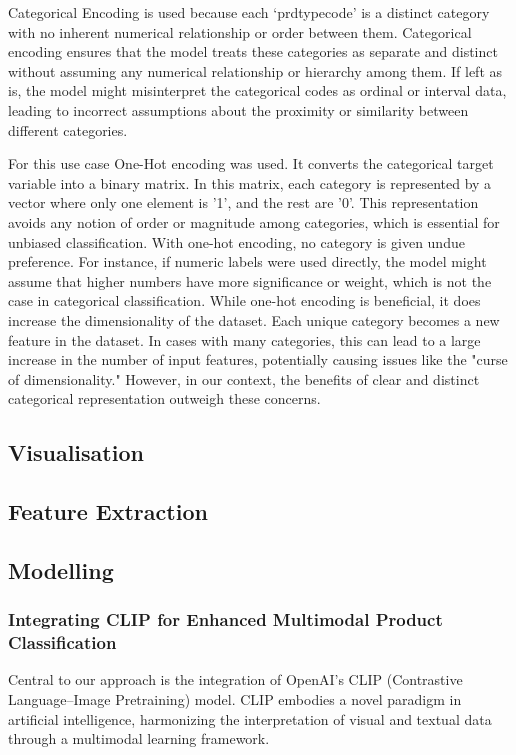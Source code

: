 Categorical Encoding is used because each ‘prdtypecode’ is a distinct category with no inherent numerical relationship or order between them. Categorical encoding ensures that the model treats these categories as separate and distinct without assuming any numerical relationship or hierarchy among them. If left as is, the model might misinterpret the categorical codes as ordinal or interval  data, leading to incorrect assumptions about the proximity or similarity between different categories.
  
For this use case One-Hot encoding was used. It converts the categorical target variable into a binary matrix. In this matrix, each category is represented by a vector where only one element is '1', and the rest are '0'. This representation avoids any notion of order or magnitude among categories, which is essential for unbiased classification.  
With one-hot encoding, no category is given undue preference. For instance, if numeric labels were used directly, the model might assume that higher numbers have more significance or weight, which is not the case in categorical classification.  
While one-hot encoding is beneficial, it does increase the dimensionality of the dataset. Each unique category becomes a new feature in the dataset. In cases with many categories, this can lead to a large increase in the number of input features, potentially causing issues like the "curse of dimensionality." However, in our context, the benefits of clear and distinct categorical representation outweigh these concerns.


\subsection{Visualisation}

\subsection{Feature Extraction}

\subsection{Modelling}

\subsubsection{Integrating CLIP for Enhanced Multimodal Product Classification}
Central to our approach is the integration of OpenAI's CLIP (Contrastive Language–Image Pretraining) model. CLIP embodies a novel paradigm in artificial intelligence, harmonizing the interpretation of visual and textual data through a multimodal learning framework.

